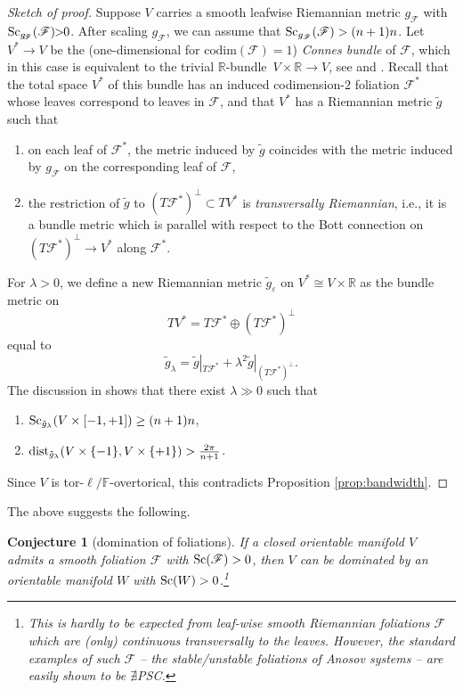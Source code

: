 \documentclass[10pt,a4paper]{amsart}
\numberwithin{equation}{section}
\newtheorem{Conjecture}[Theorem]{Conjecture}
 { \theoremstyle{definition}
\newtheorem{Definition}[Theorem]{Definition}
\newtheorem{Note}[Theorem]{Note}
\newtheorem{Example}[Theorem]{Example}
\newtheorem{Remark}[Theorem]{Remark}
}
\newcommand{\F}{\mathbb{F}}
\newcommand{\R}{\mathbb{R}}
\newcommand{\eps}{\varepsilon}
\newcommand{\Sc}{{\rm Sc}}
\newcommand{\myicon}{$\,\,\,\triangleright$}
\newcommand{\no}{{\color{brown!70!black}$\nexists$}{\sf PSC}}
\begin{document}
\begin{proof}[Sketch of proof] Suppose $V$ carries a smooth leafwise Riemannian metric $g_{\!\mathscr F}$ with ${\Sc_{g_{\!\mathscr F}} (\mathscr F)\!\! > \!\!0}$.
After scaling $g_{\mathscr F}$, we can assume that $\Sc_{g_{\mathscr F}} (\mathscr F) > (n+1)n$.
Let $V^* \to V $ be the (one-dimensional for $\mathrm{codim} (\mathscr F)=1$) {\it Connes bundle} of $\mathscr F$, which in this case is equivalent to the trivial $\R$-bundle~${V\times \mathbb R \to V}$, see \cite[Sections $1\frac{7}{8}$ and $9\frac {2}{3}$]{Gr1996} and \cite[Section 6.5.2]{Gr21}.
Recall \cite[p.\ 9]{Gr1996} that the total space $V^*$ of this bundle has an induced codimension-$2$ foliation $\mathscr F^*$ whose leaves correspond to leaves in $\mathscr F$, and that $V^*$ has a Riemannian metric $\tilde g$ such that
\begin{enumerate}[\myicon]\itemsep=0pt
 \item on each leaf of $\mathscr F^*$, the metric induced by $\tilde g$ coincides with the metric induced by $g_{\mathscr F}$ on the corresponding leaf of $\mathscr F$,
 \item the restriction of $\tilde g$ to $(T \mathscr F^*)^{\perp} \subset TV^*$ is {\em transversally Riemannian}, i.e., it is a bundle metric which is parallel with respect to the Bott connection on $(T \mathscr F^*)^{\perp} \to V^*$ along $\mathscr F^*$.
\end{enumerate}

For $\lambda > 0$, we define a new Riemannian metric $\tilde g_{\eps}$ on $V^* \cong V \times \R$ as the bundle metric on
\[
{TV^* = T\mathscr F^* \oplus (T\mathscr F^*)^{\perp}}
\]
 equal to
\[
 \tilde g_\lambda = \tilde g|_{T\mathscr F^*} + \lambda^2 \tilde g|_{(T\mathscr F^*)^{\perp}}.
\]
The discussion in \cite[p.\ 315]{Gr21} shows that there exist $\lambda \gg 0$ such that
\begin{enumerate}[\myicon]\itemsep=0pt
\item $\Sc_{\tilde g_{\lambda}} (V \times [-1, +1]) \geq (n+1)n$,
\item ${\rm dist}_{\tilde g_\lambda}( V \times \{-1\}, V\times \{+1\}) > \frac{2\pi}{n+1}$.
\end{enumerate}
Since $V$ is tor-$\ell/\F$-overtorical, this contradicts Proposition \ref{prop:bandwidth}.
\end{proof}

The above suggests the following.

\begin{Conjecture}[domination of foliations] If a closed orientable manifold $V$ admits a smooth foliation $\mathscr F$ with $\Sc(\mathscr F) > 0$, then $V$ can be dominated by an orientable manifold $W$ with $\Sc(W)>0$.\footnote{This is hardly to be expected from {\it leaf-wise} smooth Riemannian foliations $\mathscr F$ which are (only) {\it continuous} transversally to the leaves.
However, the standard examples of such $\mathscr F$ -- the stable/unstable foliations of {\it Anosov systems} -- are easily shown to be \no.}
\end{Conjecture}
\end{document}
